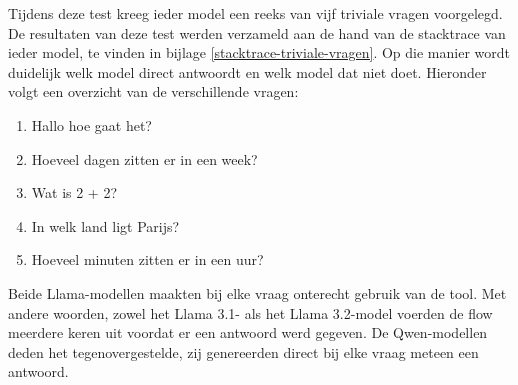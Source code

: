 Tijdens deze test kreeg ieder model een reeks van vijf triviale vragen voorgelegd. De resultaten van deze test werden verzameld aan de hand van de stacktrace van ieder model, te vinden in bijlage \ref{stacktrace-triviale-vragen}. Op die manier wordt duidelijk welk model direct antwoordt en welk model dat niet doet. Hieronder volgt een overzicht van de verschillende vragen:

\begin{enumerate}
    \item Hallo hoe gaat het?
    \item Hoeveel dagen zitten er in een week?
    \item Wat is 2 + 2?
    \item In welk land ligt Parijs?
    \item Hoeveel minuten zitten er in een uur?
\end{enumerate}

Beide Llama-modellen maakten bij elke vraag onterecht gebruik van de tool. Met andere woorden, zowel het Llama 3.1- als het Llama 3.2-model voerden de flow meerdere keren uit voordat er een antwoord werd gegeven. De Qwen-modellen deden het tegenovergestelde, zij genereerden direct bij elke vraag meteen een antwoord.


